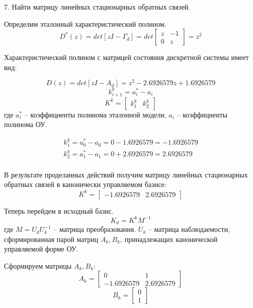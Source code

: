 \documentclass[a4paper,14pt]{extreport}
\begin{document}
7. Найти матрицу линейных стационарных обратных связей.

Определим эталонный характеристический полином.
\begin{equation}
	D^*(z) = det[zI - \Gamma_d] = det
	\begin{bmatrix}
	z & -1\\
	0 & z
	\end{bmatrix}
	= z^2
\end{equation}

Характеристический полином с матрицей состояния дискретной системы имеет вид:

\begin{equation}
	D(z) = det[zI - A_d] = z^2 - 2.6926579z + 1.6926579  
\end{equation}
\begin{equation}
	k_{i+1}^k = a_i^* - a_i
\end{equation}
\begin{equation}
	K^k = 
	\begin{bmatrix}
	k_1^k & k_2^k
	\end{bmatrix}
\end{equation}
где $a_i^*$ -- коэффициенты полинома эталонной модели, $a_i$ -- коэффициенты полинома ОУ.

\begin{align}
	k_1^k = a_0^* - a_0 = 0 - 1.6926579 = - 1.6926579\\
	k_2^k = a_1^* - a_1 = 0 + 2.6926579  = 2.6926579\\
\end{align}

В результате проделанных действий получим матрицу линейных стационарных обратных связей в канонически управляемом базисе:
\begin{equation}
K^k = 
\begin{bmatrix}
- 1.6926579 & 2.6926579
\end{bmatrix}
\end{equation}

Теперь перейдем в исходный базис.
\begin{equation}
K_d = K^k M^{-1}
\end{equation}
где $M = U_d U_k^{-1}$ -- матрица преобразования.
$U_k$ -- матрица наблюдаемости, сформированная парой матриц $A_k, B_k$, принадлежащих канонической управляемой форме ОУ.

Сформируем матрицы $A_k, B_k$:
\begin{equation}
	A_k =
	\begin{bmatrix}
	0 & 1\\
	-1.6926579 & 2.6926579
	\end{bmatrix}
\end{equation}
\begin{equation}
	B_k = \begin{bmatrix}
	0\\
	1
	\end{bmatrix}
\end{equation}
\end{document}
